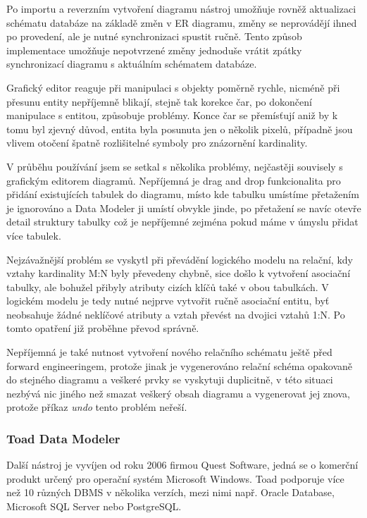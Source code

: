 \documentclass[czech,bachelor,public,dept460,male,oneside]{diploma}
\begin{document}
		Po importu a reverzním vytvoření diagramu nástroj umožňuje rovněž aktualizaci schématu databáze na základě změn v ER diagramu, změny se neprovádějí ihned po provedení, ale je nutné synchronizaci spustit ručně. Tento způsob implementace umožňuje nepotvrzené změny jednoduše vrátit zpátky synchronizací diagramu s aktuálním schématem databáze.
		
		Grafický editor reaguje při manipulaci s objekty poměrně rychle, nicméně při přesunu entity nepříjemně blikají, stejně tak korekce čar, po dokončení manipulace s entitou, způsobuje problémy. Konce čar se přemísťují aniž by k tomu byl zjevný důvod, entita byla posunuta jen o několik pixelů, případně jsou vlivem otočení špatně rozlišitelné symboly pro znázornění kardinality.
		
		V průběhu používání jsem se setkal s několika problémy, nejčastěji souvisely s grafickým editorem diagramů. Nepříjemná je drag and drop funkcionalita pro přidání existujících tabulek do diagramu, místo kde tabulku umístíme přetažením je ignorováno a Data Modeler ji umístí obvykle jinde, po přetažení se navíc otevře detail struktury tabulky což je nepříjemné zejména pokud máme v úmyslu přidat více tabulek. 
		
		Nejzávažnější problém se vyskytl při převádění logického modelu na relační, kdy vztahy kardinality M:N byly převedeny chybně, sice došlo k vytvoření asociační tabulky, ale bohužel přibyly atributy cizích klíčů také v obou tabulkách. 
		V logickém modelu je tedy nutné nejprve vytvořit ručně asociační entitu, byť neobsahuje žádné neklíčové atributy a vztah převést na dvojici vztahů 1:N. Po tomto opatření již proběhne převod správně. 
		
		Nepříjemná je také nutnost vytvoření nového relačního schématu ještě před forward engineeringem, protože jinak je vygenerováno relační schéma opakovaně do stejného diagramu a veškeré prvky se vyskytuji duplicitně, v této situaci nezbývá nic jiného než smazat veškerý obsah diagramu a vygenerovat jej znova, protože příkaz \textit{undo} tento problém neřeší.
		
		\subsubsection{Toad Data Modeler}
		Další nástroj je vyvíjen od roku 2006 firmou Quest Software, jedná se o komerční produkt určený pro operační systém Microsoft Windows. Toad podporuje více než 10 různých DBMS v několika verzích, mezi nimi např. Oracle Database, Microsoft SQL Server nebo PostgreSQL.
		
\end{document}
